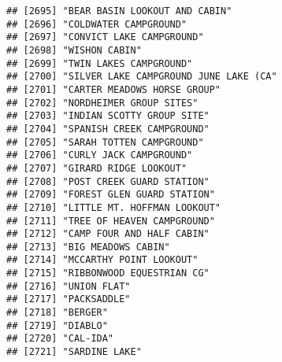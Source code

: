 \documentclass[
]{article}
\begin{document}
\begin{verbatim}
## [2695] "BEAR BASIN LOOKOUT AND CABIN"                                                        
## [2696] "COLDWATER CAMPGROUND"                                                                
## [2697] "CONVICT LAKE CAMPGROUND"                                                             
## [2698] "WISHON CABIN"                                                                        
## [2699] "TWIN LAKES CAMPGROUND"                                                               
## [2700] "SILVER LAKE CAMPGROUND JUNE LAKE (CA"                                                
## [2701] "CARTER MEADOWS HORSE GROUP"                                                          
## [2702] "NORDHEIMER GROUP SITES"                                                              
## [2703] "INDIAN SCOTTY GROUP SITE"                                                            
## [2704] "SPANISH CREEK CAMPGROUND"                                                            
## [2705] "SARAH TOTTEN CAMPGROUND"                                                             
## [2706] "CURLY JACK CAMPGROUND"                                                               
## [2707] "GIRARD RIDGE LOOKOUT"                                                                
## [2708] "POST CREEK GUARD STATION"                                                            
## [2709] "FOREST GLEN GUARD STATION"                                                           
## [2710] "LITTLE MT. HOFFMAN LOOKOUT"                                                          
## [2711] "TREE OF HEAVEN CAMPGROUND"                                                           
## [2712] "CAMP FOUR AND HALF CABIN"                                                            
## [2713] "BIG MEADOWS CABIN"                                                                   
## [2714] "MCCARTHY POINT LOOKOUT"                                                              
## [2715] "RIBBONWOOD EQUESTRIAN CG"                                                            
## [2716] "UNION FLAT"                                                                          
## [2717] "PACKSADDLE"                                                                          
## [2718] "BERGER"                                                                              
## [2719] "DIABLO"                                                                              
## [2720] "CAL-IDA"                                                                             
## [2721] "SARDINE LAKE"                                                                        

\end{verbatim}
\end{document}
